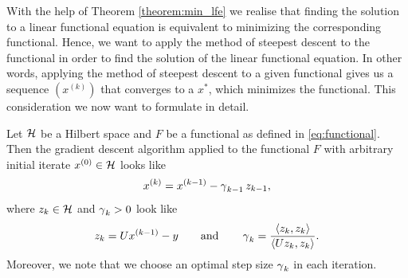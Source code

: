 With the help of Theorem \ref{theorem:min_lfe} we realise that finding the solution to a linear functional equation is equivalent to minimizing the corresponding functional. Hence, we want to apply the method of steepest descent to the functional in order to find the solution of the linear functional equation. In other words, applying the method of steepest descent to a given functional gives us a sequence $(x^{(k)})$ that converges to a $x^{\ast}$, which minimizes the functional. This consideration we now want to formulate in detail.

\begin{corollary}\label{cor:gd}
Let $\mathcal{H}$ be a Hilbert space and $F$ be a functional as defined in \eqref{eq:functional}. Then the gradient descent algorithm applied to the functional $F$ with arbitrary initial iterate $x^{(0)}\in\mathcal{H}$ looks like
\begin{align*}
x^{(k)} = x^{(k-1)} - \operatorname{\gamma}_{k-1}z_{k-1},
\end{align*}
where $z_k\in\mathcal{H}$ and $\operatorname{\gamma}_k>0$ look like
\begin{align*}
z_k = Ux^{(k-1)} - y \qquad\text{and} \qquad\operatorname{\gamma}_k = \frac{\langle z_k, z_k \rangle}{\langle Uz_k, z_k \rangle}.
\end{align*}
Moreover, we note that we choose an optimal step size $\operatorname{\gamma}_k$ in each iteration.
\end{corollary}


